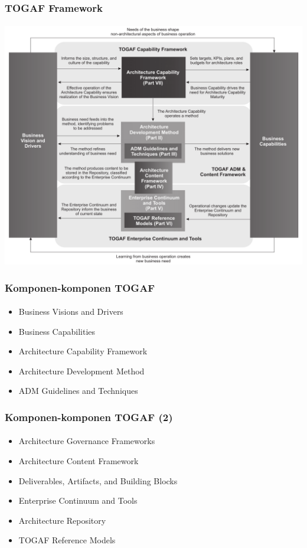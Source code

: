 \documentclass[aspectratio=169, table]{beamer}
\begin{document}
	{
		\begin{frame}
			\frametitle{TOGAF Framework}
			\framesubtitle{\hspace{1cm}}
			\begin{center}
				\includegraphics[width=.70\textwidth]{../figures/togaf}
			\end{center}
		\end{frame}
	}

	\begin{frame}
		\frametitle{Komponen-komponen TOGAF}
		\framesubtitle{\hspace{1cm}}
		\begin{itemize}
			\item Business Visions and Drivers
			\item Business Capabilities
			\item Architecture Capability Framework
			\item Architecture Development Method
			\item ADM Guidelines and Techniques
		\end{itemize}
	\end{frame}

	\begin{frame}
		\frametitle{Komponen-komponen TOGAF (2)}
		\framesubtitle{\hspace{1cm}}
		\begin{itemize}

			\item Architecture Governance Frameworks
			\item Architecture Content Framework
			\item Deliverables, Artifacts, and Building Blocks
			\item Enterprise Continuum and Tools
			\item Architecture Repository
			\item TOGAF Reference Models
		\end{itemize}
	\end{frame}
\end{document}
